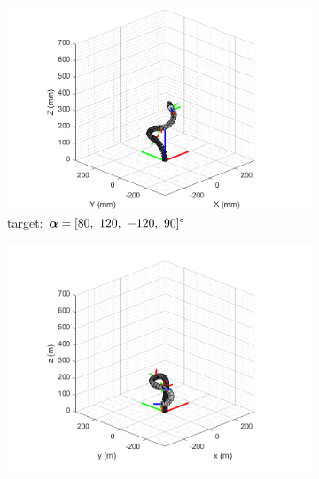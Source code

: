 \begin{figure}[H] %
    \centering %
    \captionsetup{labelsep=colon}
    \begin{subfigure}{0.9\textwidth} %
        \centering
        \includegraphics[width=\linewidth]{Image/MATLAB/manipulator_80_120_-120_90.png}
        \caption{\centering target: $\boldsymbol{\alpha} = [80,\ 120,\ -120,\ 90] \degree$ \\ \qquad}
        \label{fig:complex_target}
    \end{subfigure}
    \begin{subfigure}{0.45\textwidth} %
        \centering
        \includegraphics[width=\linewidth]{Image/MATLAB/manipulator_-8.88_-89.99_-126.81_-169.73.png}

\end{subfigure}
\end{figure}
